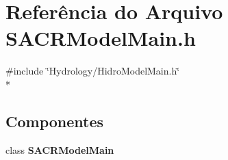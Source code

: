 \section{Referência do Arquivo S\+A\+C\+R\+Model\+Main.\+h}
\label{_s_a_c_r_model_main_8h}
{\ttfamily \#include \char`\"{}Hydrology/\+Hidro\+Model\+Main.\+h\char`\"{}}\\*
\subsection*{Componentes}
\begin{DoxyCompactItemize}
\item 
class {\bf S\+A\+C\+R\+Model\+Main}
\end{DoxyCompactItemize}
